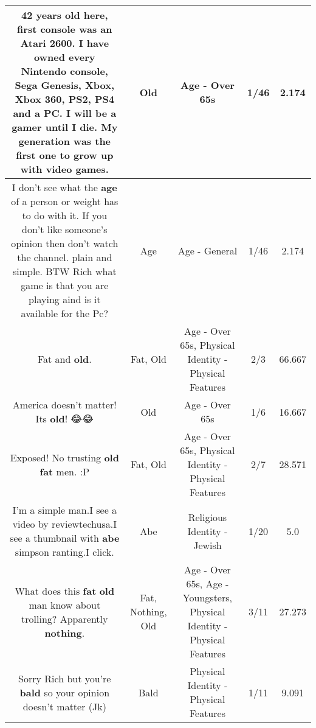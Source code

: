 \documentclass[11pt]{article}
\newlength\mylength
\begin{document}
\begin{center}
\begin{longtable}{|C{.65\mylength}|C{.30\mylength}|C{.12\mylength}|C{.12\mylength}|C{.12\mylength}|}
  \small 42 years \textbf{old} here, first console was an Atari 2600. I have owned every Nintendo console, Sega Genesis, Xbox, Xbox 360, PS2, PS4 and a PC.  I will be a gamer until I die. My generation was the first one to grow up with video games.\normalsize   & Old & Age - Over 65s & 1/46 & 2.174 \\  \hline
  \small I don't see what the \textbf{age} of a person or weight has to do with it. If you don't like someone's opinion then don't watch the channel. plain and simple. BTW Rich what game is that you are playing aind is it available for the Pc?\normalsize   & Age & Age - General & 1/46 & 2.174 \\  \hline
  \small Fat and \textbf{old}.\normalsize   & Fat, Old & Age - Over 65s, Physical Identity - Physical Features & 2/3 & 66.667 \\  \hline
  \small America doesn't matter! Its \textbf{old}! 😂😂\normalsize   & Old & Age - Over 65s & 1/6 & 16.667 \\  \hline
  \small Exposed! No trusting \textbf{old} \textbf{fat} men. :P\normalsize   & Fat, Old & Age - Over 65s, Physical Identity - Physical Features & 2/7 & 28.571 \\  \hline
  \small I'm a simple man.I see a video by reviewtechusa.I see a thumbnail with \textbf{abe} simpson ranting.I click.\normalsize   & Abe & Religious Identity - Jewish & 1/20 & 5.0 \\  \hline
  \small What does this \textbf{fat} \textbf{old} man know about trolling? Apparently \textbf{nothing}.\normalsize   & Fat, Nothing, Old & Age - Over 65s, Age - Youngsters, Physical Identity - Physical Features & 3/11 & 27.273 \\  \hline
  \small Sorry Rich but you're \textbf{bald} so your opinion doesn't matter (Jk)\normalsize   & Bald & Physical Identity - Physical Features & 1/11 & 9.091 \\  \hline

\end{longtable}
\end{center}
\end{document}

